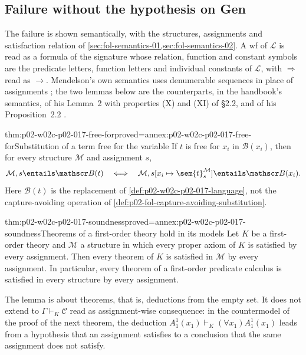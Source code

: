 \subsection{Failure without the hypothesis on Gen}
\label{sec:p02-w02c-p02-017-failure}

The failure is shown semantically, with the structures, assignments and
satisfaction relation of \cref{sec:fol-semantics-01,sec:fol-semantics-02}.
A wf of \(\mathscr L\) is read as a formula of the signature whose relation,
function and constant symbols are the predicate letters, function letters and
individual constants of \(\mathscr L\), with \(\Rightarrow\) read as \(\to\).
Mendelson's own semantics uses denumerable sequences in place of assignments
\cite[\S 2.2, pp.~57--60]{Mendelson1997}; the two lemmas below are the
counterparts, in the handbook's semantics, of his Lemma~2 with properties (X)
and (XI) of \S 2.2, and of his Proposition~2.2
\cite[\S 2.2, p.~63; \S 2.4, p.~72]{Mendelson1997}.

\begin{hblemma}{thm:p02-w02c-p02-017-free-for}{proved=annex:p02-w02c-p02-017-free-for}{Substitution of a term free for the variable}
If \(t\) is free for \(x_i\) in \(\mathscr B(x_i)\), then for every structure
\(\mathcal M\) and assignment \(s\),
\[
 \mathcal M,s\entails\mathscr B(t)
 \quad\Longleftrightarrow\quad
 \mathcal M,s[x_i\mapsto\sem{t}^{\mathcal M}_{s}]
   \entails\mathscr B(x_i).
\]
Here \(\mathscr B(t)\) is the replacement of
\cref{def:p02-w02c-p02-017-language}, not the capture-avoiding operation of
\cref{def:p02-fol-capture-avoiding-substitution}.
\end{hblemma}

\begin{hblemma}{thm:p02-w02c-p02-017-soundness}{proved=annex:p02-w02c-p02-017-soundness}{Theorems of a first-order theory hold in its models}
Let \(K\) be a first-order theory and \(\mathcal M\) a structure in which
every proper axiom of \(K\) is satisfied by every assignment.  Then every
theorem of \(K\) is satisfied in \(\mathcal M\) by every assignment.  In
particular, every theorem of a first-order predicate calculus is satisfied in
every structure by every assignment.
\end{hblemma}

The lemma is about theorems, that is, deductions from the empty set.  It does
not extend to \(\Gamma\vdash_K\mathscr C\) read as assignment-wise
consequence: in the countermodel of the proof of the next theorem, the
deduction \(A^1_1(x_1)\vdash_K(\forall x_1)A^1_1(x_1)\) leads from a
hypothesis that an assignment satisfies to a conclusion that the same
assignment does not satisfy.


